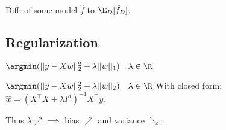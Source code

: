 \begin{definition}[\textcolor{H2}{Variance}]
  Diff. of some model \(\hat{f}\) to \(\E_D[\hat{f}_D]\).
\end{definition}

\subsection*{Regularization}
\begin{definition}[Lasso]
  \(\argmin(||y - Xw||_2^2 + \lambda ||w||_1) \quad \lambda \in \R\)
\end{definition}

\begin{definition}[Ridge]
  \(\argmin(||y - Xw||_2^2 + \lambda ||w||_2) \quad \lambda \in \R\)
  With closed form: \(\hat{w} = (X^\top X + \lambda I^d)^{-1}X^\top y\).
\end{definition}

Thus \(\lambda \nearrow \implies\) bias \(\nearrow\) and variance \(\searrow\).